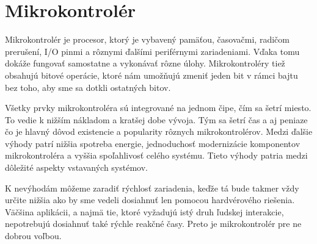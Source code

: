\section{Mikrokontrolér}
\noindent
Mikrokontrolér je procesor, ktorý je vybavený pamäťou, časovačmi, radičom prerušení, I/O pinmi a rôznymi ďalšími periférnymi
zariadeniami. Vďaka tomu dokáže fungovať samostatne a vykonávať rôzne úlohy. Mikrokontroléry tiež obsahujú bitové operácie, ktoré nám umožňujú zmeniť jeden bit v rámci bajtu bez toho, aby sme sa dotkli ostatných bitov. \par
Všetky prvky mikrokontroléra sú integrované na jednom čipe, čím sa šetrí miesto.
To vedie k nižším nákladom a kratšej dobe vývoja. Tým sa šetrí čas a aj peniaze čo je hlavný
dôvod existencie a popularity rôznych mikrokontrolérov. Medzi ďalšie výhody patrí nižšia spotreba energie,
jednoduchosť modernizácie komponentov mikrokontroléra a vyššia spoľahlivosť
celého systému. Tieto výhody patria medzi dôležité aspekty vstavaných systémov. \par
K nevýhodám môžeme zaradiť rýchlosť zariadenia, keďže tá bude takmer vždy určite
nižšia ako by sme vedeli dosiahnuť len pomocou hardvérového riešenia. Väčšina aplikácii, a najmä tie, ktoré vyžadujú istý druh ľudskej interakcie, nepotrebujú
dosiahnuť také rýchle reakčné časy. Preto je mikrokontrolér pre ne dobrou voľbou.
\cite{guntherIntroductionMicrocontrollers2007}


